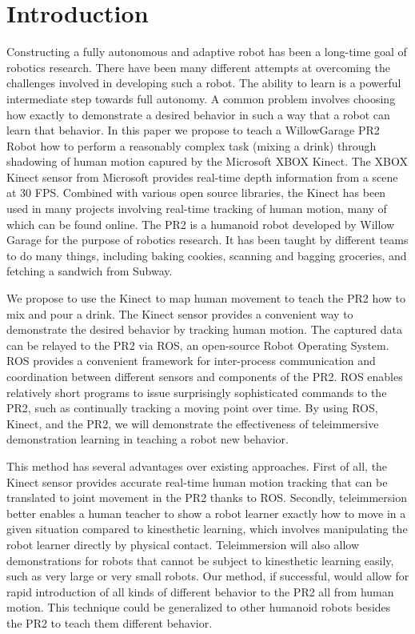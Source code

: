 \documentclass{sig-alternate}
\begin{document}
\section{Introduction}
\label{sec:intro}
Constructing a fully autonomous and adaptive robot has been a long-time goal of robotics research. There have been many different attempts at overcoming the challenges involved in developing such a robot. The ability to learn is a powerful intermediate step towards full autonomy. A common problem involves choosing how exactly to demonstrate a desired behavior in such a way that a robot can learn that behavior. In this paper we propose to teach a WillowGarage PR2 Robot how to perform a reasonably complex task (mixing a drink) through shadowing of human motion capured by the Microsoft XBOX Kinect. The XBOX Kinect sensor from Microsoft provides real-time depth information from a scene at 30 FPS. Combined with various open source libraries\cite{kinect}, the Kinect has been used in many projects involving real-time tracking of human motion, many of which can be found online\cite{freenect}. The PR2 is a humanoid robot developed by  Willow Garage\cite{pr2} for the purpose of robotics research. It  has been taught by different teams to do many things, including baking cookies\cite{cookies}, scanning and bagging groceries\cite{groceries}, and fetching a sandwich from Subway\cite{subway}.

We propose to use the Kinect to map human movement to teach the PR2 how to mix and pour a drink. The Kinect sensor provides a convenient way to demonstrate the desired behavior by tracking human motion. The captured data can be relayed to the PR2 via ROS, an open-source Robot Operating System\cite{ros}. ROS provides a convenient framework for inter-process communication and coordination between different sensors and components of the PR2. ROS enables relatively short programs to issue surprisingly sophisticated commands to the PR2, such as continually tracking a moving point over time\cite{ros_pr2}. By using ROS, Kinect, and the PR2, we will demonstrate the effectiveness of teleimmersive demonstration learning in teaching a robot new behavior.

This method has several advantages over existing approaches. First of all, the Kinect sensor provides accurate real-time human motion tracking that can be translated to joint movement in the PR2 thanks to ROS. Secondly, teleimmersion better enables a human teacher to show a robot learner exactly how to move in a given situation compared to kinesthetic learning, which involves manipulating the robot learner directly by physical contact. Teleimmersion will also allow demonstrations for robots that cannot be subject to kinesthetic learning easily, such as very large or very small robots. Our method, if successful, would allow for rapid introduction of all kinds of different behavior to the PR2 all from human motion. This technique could be generalized to other humanoid robots besides the PR2 to teach them different behavior.
	
\end{document}
